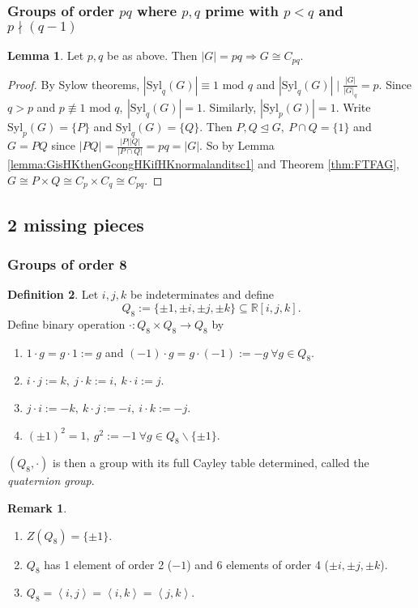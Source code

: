\documentclass[a4paper]{article}
\newcommand{\la}{\left\langle}
\newcommand{\ra}{\right\rangle}
\newcommand{\Syl}{\text{Syl}}
\newcommand{\Mod}{\text{ mod }}
\theoremstyle{definition}
\newtheorem{defn}{Definition}[subsection]
\newtheorem{lemma}[defn]{Lemma}
\newtheorem*{remark}{Remark}
\begin{document}
\subsubsection{Groups of order $pq$ where $p,q$ prime with $p<q$ and $p\nmid (q-1)$}
\begin{lemma}
Let $p,q$ be as above. Then $|G|=pq\Rightarrow G\cong C_{pq}$.
\end{lemma}
\begin{proof}
By Sylow theorems, $|\Syl_q(G)|\equiv 1\Mod q$ and $|\Syl_q(G)|\mid \frac{|G|}{|G|_q}=p$. Since $q>p$ and $p\not\equiv 1\Mod q,\ |\Syl_q(G)|=1$. Similarly, $|\Syl_p(G)|=1$. Write $\Syl_p(G)=\{P\}$ and $\Syl_q(G)=\{Q\}$. Then $P,Q\unlhd G,\ P\cap Q=\{1\}$ and $G=PQ$ since $|PQ|=\frac{|P||Q|}{|P\cap Q|}=pq=|G|$. So by Lemma \ref{lemma:GisHKthenGcongHKifHKnormalanditsc1} and Theorem \ref{thm:FTFAG}, $G\cong P\times Q\cong C_p\times C_q\cong C_{pq}$.
\end{proof}

\subsection{2 missing pieces}
\subsubsection{Groups of order 8}
\begin{defn}
Let $i,j,k$ be indeterminates and define
\[
Q_8:=\{\pm1,\pm i,\pm j,\pm k\}\subseteq \mathbb R[i,j,k].
\]
Define binary operation $\cdot:Q_8\times Q_8\rightarrow Q_8$ by
\begin{enumerate}
\item $1\cdot g=g\cdot 1:=g$ and $(-1)\cdot g=g\cdot(-1):=-g \ \forall g\in Q_8$.
\item $i\cdot j:=k,\ j\cdot k:=i,\ k\cdot i:=j$.
\item $j\cdot i:=-k,\ k\cdot j:=-i,\ i\cdot k:=-j$.
\item $(\pm 1)^2=1,\ g^2:=-1 \ \forall g\in Q_8\backslash\{\pm1\}$.
\end{enumerate}
$(Q_8,\cdot)$ is then a group with its full Cayley table determined, called the \textit{quaternion group}.
\end{defn}

\begin{remark}
\begin{enumerate}
\item $Z(Q_8)=\{\pm1\}$.
\item $Q_8$ has 1 element of order 2 ($-1$) and 6 elements of order 4 ($\pm i,\pm j,\pm k$).
\item $Q_8=\la i,j\ra=\la i,k\ra=\la j,k\ra$.
\end{enumerate}
\end{remark}
\end{document}

